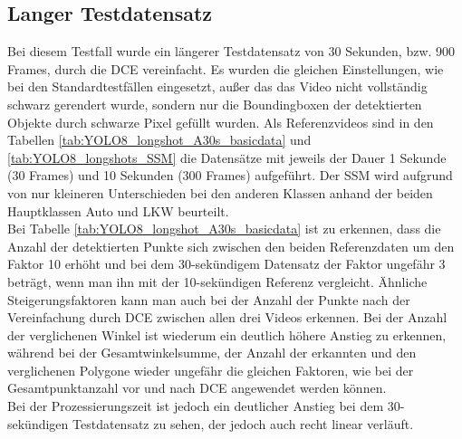 \subsection{Langer Testdatensatz}{
	Bei diesem Testfall wurde ein längerer Testdatensatz von 30 Sekunden, bzw. 900 Frames, durch die DCE vereinfacht. Es wurden die gleichen Einstellungen, wie bei den Standardtestfällen eingesetzt, außer das das Video nicht vollständig schwarz gerendert wurde, sondern nur die Boundingboxen der detektierten Objekte durch schwarze Pixel gefüllt wurden. Als Referenzvideos sind in den Tabellen \ref{tab:YOLO8_longshot_A30s_basicdata} und \ref{tab:YOLO8_longshots_SSM} die Datensätze mit jeweils der Dauer 1 Sekunde (30 Frames) und 10 Sekunden (300 Frames) aufgeführt. Der SSM wird aufgrund von nur kleineren Unterschieden bei den anderen Klassen anhand der beiden Hauptklassen Auto und LKW beurteilt. \\
	Bei Tabelle \ref{tab:YOLO8_longshot_A30s_basicdata} ist zu erkennen, dass die Anzahl der detektierten Punkte sich zwischen den beiden Referenzdaten um den Faktor 10 erhöht und bei dem 30-sekündigem Datensatz der Faktor ungefähr 3 beträgt, wenn man ihn mit der 10-sekündigen Referenz vergleicht. Ähnliche Steigerungsfaktoren kann man auch bei der Anzahl der Punkte nach der Vereinfachung durch DCE zwischen allen drei Videos erkennen. Bei der Anzahl der verglichenen Winkel ist wiederum ein deutlich höhere Anstieg zu erkennen, während bei der Gesamtwinkelsumme, der Anzahl der erkannten und den verglichenen Polygone wieder ungefähr die gleichen Faktoren, wie bei der Gesamtpunktanzahl vor und nach DCE angewendet werden können. \\
	Bei der Prozessierungszeit ist jedoch ein deutlicher Anstieg bei dem 30-sekündigen Testdatensatz zu sehen, der jedoch auch recht linear verläuft.

}
